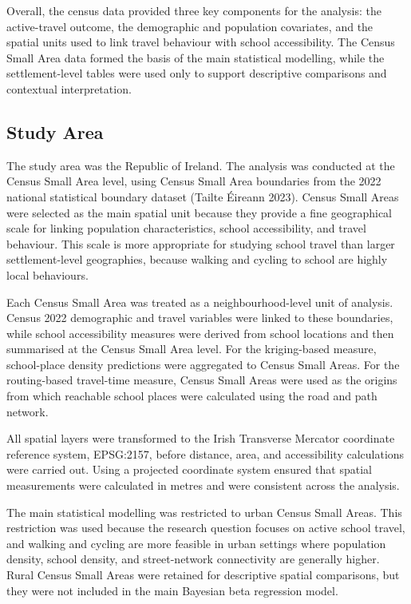 \documentclass{article}
\begin{document}
Overall, the census data provided three key components for the analysis:
the active-travel outcome, the demographic and population covariates,
and the spatial units used to link travel behaviour with school
accessibility. The Census Small Area data formed the basis of the main
statistical modelling, while the settlement-level tables were used only
to support descriptive comparisons and contextual interpretation.

\subsection{Study Area}\label{study-area}

The study area was the Republic of Ireland. The analysis was conducted
at the Census Small Area level, using Census Small Area boundaries from
the 2022 national statistical boundary dataset (Tailte Éireann 2023).
Census Small Areas were selected as the main spatial unit because they
provide a fine geographical scale for linking population
characteristics, school accessibility, and travel behaviour. This scale
is more appropriate for studying school travel than larger
settlement-level geographies, because walking and cycling to school are
highly local behaviours.

Each Census Small Area was treated as a neighbourhood-level unit of
analysis. Census 2022 demographic and travel variables were linked to
these boundaries, while school accessibility measures were derived from
school locations and then summarised at the Census Small Area level. For
the kriging-based measure, school-place density predictions were
aggregated to Census Small Areas. For the routing-based travel-time
measure, Census Small Areas were used as the origins from which
reachable school places were calculated using the road and path network.

All spatial layers were transformed to the Irish Transverse Mercator
coordinate reference system, EPSG:2157, before distance, area, and
accessibility calculations were carried out. Using a projected
coordinate system ensured that spatial measurements were calculated in
metres and were consistent across the analysis.

The main statistical modelling was restricted to urban Census Small
Areas. This restriction was used because the research question focuses
on active school travel, and walking and cycling are more feasible in
urban settings where population density, school density, and
street-network connectivity are generally higher. Rural Census Small
Areas were retained for descriptive spatial comparisons, but they were
not included in the main Bayesian beta regression model.
\end{document}
